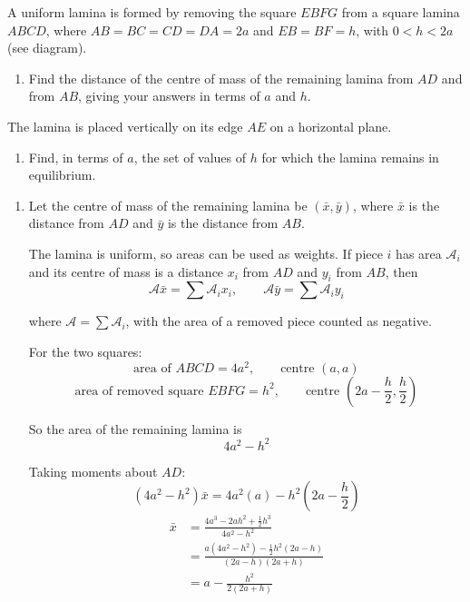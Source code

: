 \documentclass[leqno]{article}
\begin{document}
\begin{enumerate}[
  label=\textbf{\arabic*.},
  leftmargin=*,
  topsep=0pt,
  partopsep=0pt,
  parsep=0pt
]
A uniform lamina is formed by removing the square $EBFG$ from a square lamina $ABCD$, where $AB=BC=CD=DA=2a$ and $EB=BF=h$, with $0<h<2a$ (see diagram). \\
\begin{enumerate}[label=\textbf{(\alph*)}]
  \item Find the distance of the centre of mass of the remaining lamina from $AD$ and from $AB$, giving your answers in terms of $a$ and $h$.  \\
\end{enumerate}
The lamina is placed vertically on its edge $AE$ on a horizontal plane. \\
\begin{enumerate}[label=\textbf{(\alph*)}, resume]
  \item Find, in terms of $a$, the set of values of $h$ for which the lamina remains in equilibrium.  \\
\end{enumerate}

\vspace*{10pt}

\begin{djsSolution}
\begin{enumerate}[label=\textbf{(\alph*)}, start=1]
  \item Let the centre of mass of the remaining lamina be \((\bar x,\bar y)\), where \(\bar x\) is the distance from \(AD\) and \(\bar y\) is the distance from \(AB\).

The lamina is uniform, so areas can be used as weights. If piece \(i\) has area \(\mathcal{A}_i\) and its centre of mass is a distance \(x_i\) from \(AD\) and \(y_i\) from \(AB\), then
\[
\mathcal{A}\bar x=\sum\mathcal{A}_ix_i,\qquad\mathcal{A}\bar y=\sum\mathcal{A}_iy_i
\]

where \(\mathcal{A}=\sum\mathcal{A}_i\), with the area of a removed piece counted as negative.

For the two squares:
\[
\text{area of }ABCD=4a^2, \qquad \text{centre }(a,a)
\]
\[
\text{area of removed square }EBFG=h^2, \qquad \text{centre }\left(2a-\frac h2,\frac h2\right)
\]

So the area of the remaining lamina is
\[
4a^2-h^2
\]

Taking moments about \(AD\):
\[
(4a^2-h^2)\bar x=4a^2(a)-h^2\left(2a-\frac h2\right)
\]
\begin{align*}
\bar x&=\frac{4a^3-2ah^2+\frac12h^3}{4a^2-h^2}\\
&=\frac{a(4a^2-h^2)-\frac12h^2(2a-h)}{(2a-h)(2a+h)}\\
&=a-\frac{h^2}{2(2a+h)}
\end{align*}


\end{enumerate}
\end{djsSolution}
\end{enumerate}
\end{document}
